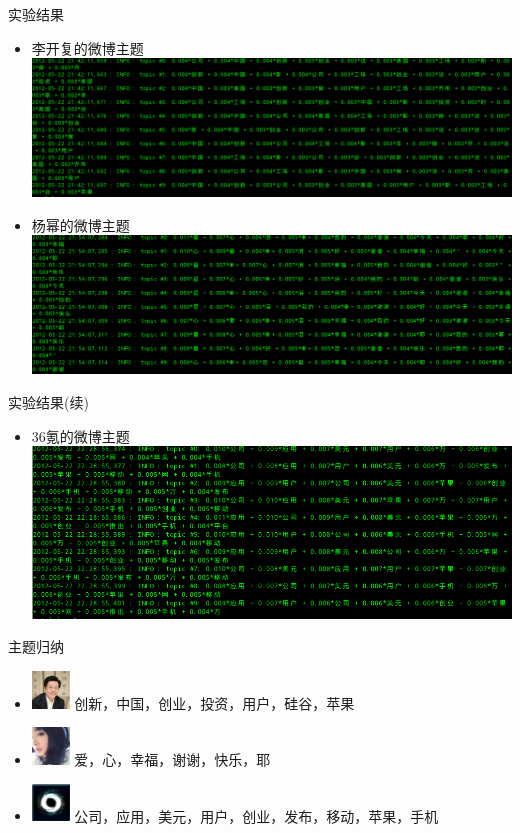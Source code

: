 \documentclass[hyperref={unicode}]{beamer}
\begin{document}
\begin{CJK}{UTF8}{gkai}
\begin{frame}{实验结果}
 \begin{itemize}
 \item 李开复的微博主题
   \includegraphics[scale=0.3]{likaifu}
 \item 杨幂的微博主题
\includegraphics[scale=0.3]{yangmi}
\end{itemize}
\end{frame}
\begin{frame}{实验结果(续)}
 \begin{itemize}
 \item 36氪的微博主题
   \includegraphics[scale=0.3]{36ke}
\end{itemize}
\end{frame}
\begin{frame}{主题归纳}
\begin{itemize}
\item \includegraphics[width=1.0cm]{likaifulogo}
  \alert{创新，中国，创业，投资，用户，硅谷，苹果}
\item \includegraphics[width=1.0cm]{yangmilogo}
  \alert{爱，心，幸福，谢谢，快乐，耶}
\item \includegraphics[width=1.0cm]{36kelogo}
  \alert{公司，应用，美元，用户，创业，发布，移动，苹果，手机}
\end{itemize}
\end{frame}


\end{CJK}
\end{document}

